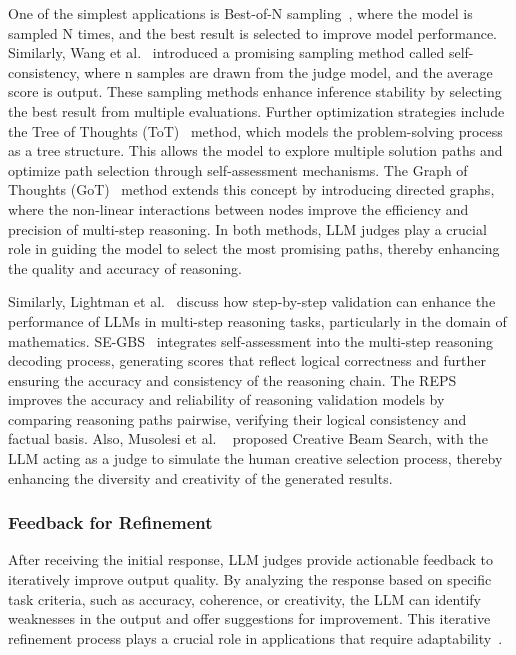 One of the simplest applications is Best-of-N sampling~\cite{jinnai2024regularized,sun2024fast}, where the model is sampled N times, and the best result is selected to improve model performance. Similarly, Wang et al.~\cite{wang2022self} introduced a promising sampling method called self-consistency, where n samples are drawn from the judge model, and the average score is output. These sampling methods enhance inference stability by selecting the best result from multiple evaluations.
Further optimization strategies include the Tree of Thoughts (ToT)~\cite{yao2024tree} method, which models the problem-solving process as a tree structure. This allows the model to explore multiple solution paths and optimize path selection through self-assessment mechanisms.
The Graph of Thoughts (GoT)~\cite{besta2024graph} method extends this concept by introducing directed graphs, where the non-linear interactions between nodes improve the efficiency and precision of multi-step reasoning. In both methods, LLM judges play a crucial role in guiding the model to select the most promising paths, thereby enhancing the quality and accuracy of reasoning.

Similarly, Lightman et al.~\cite{lightman2023let} discuss how step-by-step validation can enhance the performance of LLMs in multi-step reasoning tasks, particularly in the domain of mathematics. SE-GBS~\cite{xie2024self} integrates self-assessment into the multi-step reasoning decoding process, generating scores that reflect logical correctness and further ensuring the accuracy and consistency of the reasoning chain. The REPS~\cite{kawabata2024rationale} improves the accuracy and reliability of reasoning validation models by comparing reasoning paths pairwise, verifying their logical consistency and factual basis.
Also, Musolesi et al. ~\cite{musolesi2024creative} proposed Creative Beam Search, with the LLM acting as a judge to simulate the human creative selection process, thereby enhancing the diversity and creativity of the generated results.



\subsubsection{Feedback for Refinement}
\label{sec: Feedback for Refinement}
After receiving the initial response, LLM judges provide actionable feedback to iteratively improve output quality. By analyzing the response based on specific task criteria, such as accuracy, coherence, or creativity, the LLM can identify weaknesses in the output and offer suggestions for improvement. This iterative refinement process plays a crucial role in applications that require adaptability~\cite{madaan2024self,paul2023refiner,chen2023teaching,xu2023towards,huang2023large}.

